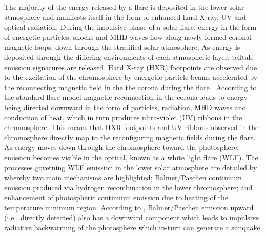 The majority of the energy released by a flare is deposited in the lower solar atmosphere and manifests itself in the form of enhanced hard X-ray, UV and optical radiation. During the impulsive phase of a solar flare, energy in the form of energetic particles, shocks and MHD waves flow along newly formed coronal magnetic loops, down through the stratified solar atmosphere. As energy is deposited through the differing environments of each atmospheric layer, telltale emission signatures are released. Hard X-ray (HXR) footpoints are observed due to the excitation of the chromosphere by energetic particle beams accelerated by the reconnecting magnetic field in the the corona during the flare \citep{1995ApJ...455..347A}. According to the standard flare model \citep{1964NASSP..50..451C, 1966Natur.211..695S, 1974SoPh...34..323H, 1976SoPh...50...85K} magnetic reconnection in the corona leads to energy being directed downward in the form of particles, radiation, MHD waves and conduction of heat, which in turn produces ultra-violet (UV) ribbons in the chromosphere. This means that HXR footpoints and UV ribbons observed in the chromosphere directly map to the reconfiguring magnetic fields during the flare. As energy moves down through the chromosphere toward the photosphere, emission becomes visible in the optical, known as a white light flare (WLF). The processes governing WLF emission in the lower solar atmosphere are detailed by \cite{2007ASPC..368..417D} whereby two main mechanisms are highlighted; Balmer/Paschen continuum emission produced via hydrogen recombination in the lower chromosphere; and enhancement of photospheric continuum emission due to heating of the temperature minimum region. According to \cite{1989SoPh..124..303M}, Balmer/Paschen emission upward (i.e., directly detected) also has a downward component which leads to impulsive radiative backwarming of the photosphere which in-turn can generate a sunquake. 


